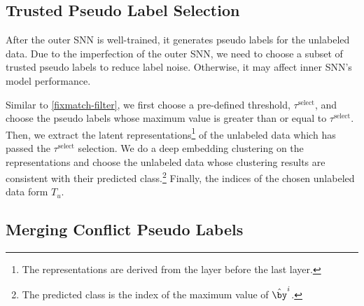 \documentclass{article}
\begin{document}

\subsection{Trusted Pseudo Label Selection}
\label{subsec:outer-trust-selection}

After the outer SNN is well-trained, it generates pseudo labels for the unlabeled data.
Due to the imperfection of the outer SNN, we need to choose a subset of trusted pseudo labels to reduce label noise.
Otherwise, it may affect inner SNN's model performance.

Similar to \eqref{fixmatch-filter}, we first choose a pre-defined threshold, $\tau^{\text{select}}$, and choose the pseudo labels whose maximum value is greater than or equal to $\tau^{\text{select}}$.
Then, we extract the latent representations\footnote{
The representations are derived from the layer before the last layer.
}
of the unlabeled data which has passed the $\tau^{\text{select}}$ selection.
We do a deep embedding clustering \cite{JX16a, XY21a} on the representations and
choose the unlabeled data whose clustering results are consistent with their predicted class.\footnote{
    The predicted class is the index of the maximum value of $\hat{\by}^i$.    
}
Finally, the indices of the chosen unlabeled data form $T_u$.

\subsection{Merging Conflict Pseudo Labels}
\label{subsec:heuristic-teacher-student}
\end{document}
